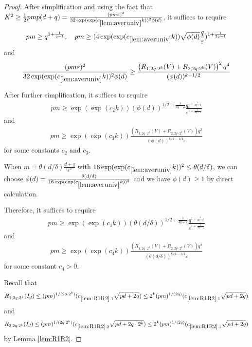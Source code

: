 \documentclass[11pt]{amsart}
\numberwithin{equation}{section}
\numberwithin{equation}{section}
\begin{document}
\begin{proof}
After simplification and using the fact that $K^2 \ge \frac{1}{2}pmp(d+q)=\frac{(pm \varepsilon)^2}{32\exp(\exp(c_{\ref{lem:averuniv}}k))^2\phi(d)}$, it suffices to require
\begin{align*}
    pm \ge q^{1+\frac{1}{q-1}}, \quad pm \ge (4\exp(\exp(c_{\ref{lem:averuniv}}k))\sqrt{\phi(d)}\frac{q}{\varepsilon})^{1+\frac{1}{2q-1}}
\end{align*}
and
\begin{align*}
    \frac{(pm \varepsilon)^2}{32\exp(\exp(c_{\ref{lem:averuniv}}k))^2\phi(d)} \ge \frac{\left(R_{1,2q \cdot 2^k}(V)+R_{2,2q \cdot 2^k}(V)\right)^2 q^{4}}{(\phi(d))^{k+1/2}}
\end{align*}

After further simplification, it suffices to require
\begin{align*}
    pm \ge \exp(\exp(c_{2}k))(\phi(d))^{1/2+\frac{1}{4q-2}}\frac{q^{1+\frac{1}{2q-1}}}{\varepsilon^{1+\frac{1}{2q-1}}}
\end{align*}
and
\begin{align*}
    {pm } \ge {\exp(\exp(c_3k))}\frac{\left(R_{1,2q \cdot 2^k}(V)+R_{2,2q \cdot 2^k}(V)\right) q^{2}}{(\phi(d))^{k/2-1/4}\varepsilon}
\end{align*}
for some constants $c_2$ and $c_3$.

When $m=\theta(d/\delta)\frac{d+q}{\varepsilon^2}$ with $16\exp(\exp(c_{\ref{lem:averuniv}}k))^2 \le \theta(d/\delta)$, we can choose $\phi(d)=\frac{\theta(d/\delta)}{16\exp(\exp(c_{\ref{lem:averuniv}}k))^2}$ and we have $\phi(d) \ge 1$ by direct calculation. 

Therefore, it suffices to require
\begin{align*}
    pm \ge \exp(\exp(c_{4}k))(\theta(d/\delta))^{1/2+\frac{1}{4q-2}}\frac{q^{1+\frac{1}{2q-1}}}{\varepsilon^{1+\frac{1}{2q-1}}}
\end{align*}
and
\begin{align*}
    {pm } \ge {\exp(\exp(c_4k))}\frac{\left(R_{1,2q \cdot 2^k}(V)+R_{2,2q \cdot 2^k}(V)\right) q^{2}}{(\theta(d/\delta))^{k/2-1/4}\varepsilon}
\end{align*}
for some constant $c_4>0$. 

Recall that
\begin{align*}
    R_{1,2q \cdot 2^k}(I_d) \le (pm)^{1/(2q \cdot 2^k)}(c_{\ref{lem:R1R2}.1}\sqrt{pd+2q })
    \le 2^k(pm)^{1/(2q)}(c_{\ref{lem:R1R2}.1}\sqrt{pd+2q })
\end{align*}
and
\begin{align*}
    R_{2,2q \cdot 2^k}(I_d) \le (pm)^{1/(2q \cdot 2^k)}(c_{\ref{lem:R1R2}.2}\sqrt{pd+2q \cdot 2^k})\le 2^k(pm)^{1/(2q)}(c_{\ref{lem:R1R2}.1}\sqrt{pd+2q})
\end{align*}
by Lemma \ref{lem:R1R2}.


\end{proof}
\end{document}
